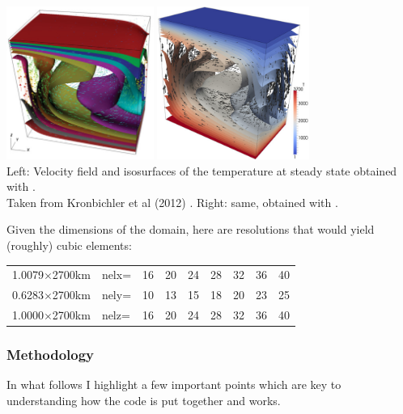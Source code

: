 \begin{center}
\includegraphics[height=5cm]{python_codes/fieldstone_20/images/krhb12}
\includegraphics[height=5cm]{python_codes/fieldstone_20/images/elefant}\\
{\captionfont Left: 
Velocity field and isosurfaces of the temperature at steady state obtained 
with \aspect.\\ Taken from Kronbichler et al (2012) \cite{krhb12}.
Right: same, obtained with \elefant \cite{thie14}.}
\end{center}


\noindent Given the dimensions of the domain, here are resolutions that would yield (roughly) cubic elements:
\begin{center}
\begin{tabular}{l|lccccccc|}
1.0079$\times$2700km&nelx= &16 &20 &24 &28 &32 &36 &40 \\  
0.6283$\times$2700km&nely= &10 &13 &15 &18 &20 &23 &25 \\
1.0000$\times$2700km&nelz= &16 &20 &24 &28 &32 &36 &40 \\  
\end{tabular}
\end{center}

\subsubsection*{Methodology}

In what follows I highlight a few important points which are key to understanding how the code
is put together and works. 

